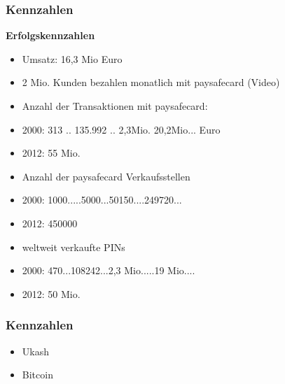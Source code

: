 \subsubsection{Kennzahlen}

\textbf{Erfolgskennzahlen}
\begin{itemize}
        \item Umsatz: 16,3 Mio Euro
        \item 2 Mio. Kunden bezahlen monatlich mit paysafecard (Video)
        \item Anzahl der Transaktionen mit paysafecard:
        \item   2000: 313    ..  135.992   .. 2,3Mio.  20,2Mio... Euro
        \item   2012: 55 Mio.
        \item Anzahl der paysafecard Verkaufsstellen
        \item   2000: 1000.....5000...50150....249720...
        \item   2012: 450000
        \item weltweit verkaufte PINs
        \item   2000: 470...108242...2,3 Mio.....19 Mio....
        \item   2012: 50 Mio.
\end{itemize}


\subsubsection{Kennzahlen}

\begin{itemize}
        \item Ukash
        \item Bitcoin
\end{itemize}